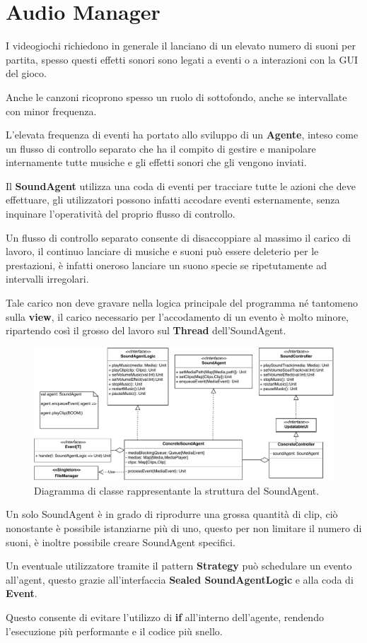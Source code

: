 \section{Audio Manager}
\label{sec:audio_manager_design}
I videogiochi richiedono in generale il lanciano di un elevato numero di suoni per partita, spesso questi effetti sonori sono legati a eventi o a interazioni con la GUI del gioco.

Anche le canzoni ricoprono spesso un ruolo di sottofondo, anche se intervallate con minor frequenza.

L'elevata frequenza di eventi ha portato allo sviluppo di un \textbf{Agente}, inteso come un flusso di controllo separato che ha il compito di gestire e manipolare internamente tutte musiche e gli effetti sonori che gli vengono inviati.


Il \textbf{SoundAgent} utilizza una coda di eventi per tracciare tutte le azioni che deve effettuare, gli utilizzatori possono infatti accodare eventi esternamente, senza inquinare l'operatività del proprio flusso di controllo.

Un flusso di controllo separato consente di disaccoppiare al massimo il carico di lavoro, il continuo lanciare di musiche e suoni può essere deleterio per le prestazioni, è infatti oneroso lanciare un suono specie se ripetutamente ad intervalli irregolari.

Tale carico non deve gravare nella logica principale del programma né tantomeno sulla \textbf{view}, il carico necessario per l'accodamento di un evento è molto minore, ripartendo così il grosso del lavoro sul \textbf{Thread} dell'SoundAgent.

\begin{figure}[H]
	\centering
	\includegraphics[width=0.99\columnwidth]{drawio/audioAgent/audioAgent.pdf}
	\caption{Diagramma di classe rappresentante la struttura del SoundAgent.}
	\label{fig:AudioAgent}
\end{figure}

Un solo SoundAgent è in grado di riprodurre una grossa quantità di clip, ciò nonostante è possibile istanziarne più di uno, questo per non limitare il numero di suoni, è inoltre possibile creare SoundAgent specifici.

Un eventuale utilizzatore tramite il pattern \textbf{Strategy} può schedulare un evento all'agent, questo grazie all'interfaccia \textbf{Sealed SoundAgentLogic}
e alla coda di \textbf{Event}.

Questo consente di evitare l'utilizzo di \textbf{if} all'interno dell'agente, rendendo l'esecuzione più performante e il codice più snello.